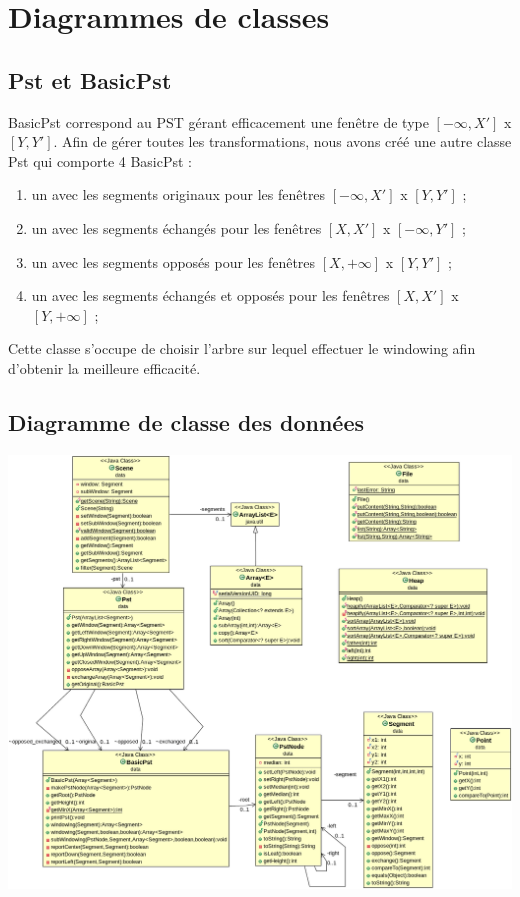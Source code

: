 \documentclass[10pt,a4paper]{article}
\begin{document}
\section{Diagrammes de classes}
\subsection{Pst et BasicPst}
BasicPst correspond au PST gérant efficacement une fenêtre de type $[-\infty, X']$ x $[Y, Y']$. Afin de gérer toutes les transformations, nous avons créé une autre classe Pst qui comporte 4 BasicPst :
\begin{enumerate}
	\item un avec les segments originaux pour les fenêtres $[-\infty, X']$ x $[Y, Y']$ ;
	\item un avec les segments échangés pour les fenêtres $[X, X']$ x $[-\infty, Y']$ ;
	\item un avec les segments opposés pour les fenêtres $[X, +\infty]$ x $[Y, Y']$ ;
	\item un avec les segments échangés et opposés pour les fenêtres $[X, X']$ x $[Y, +\infty]$ ;
\end{enumerate}

Cette classe s'occupe de choisir l'arbre sur lequel effectuer le windowing afin d'obtenir la meilleure efficacité.

\subsection{Diagramme de classe des données}
\includegraphics[scale=0.25]{images/data.png}
\end{document}
